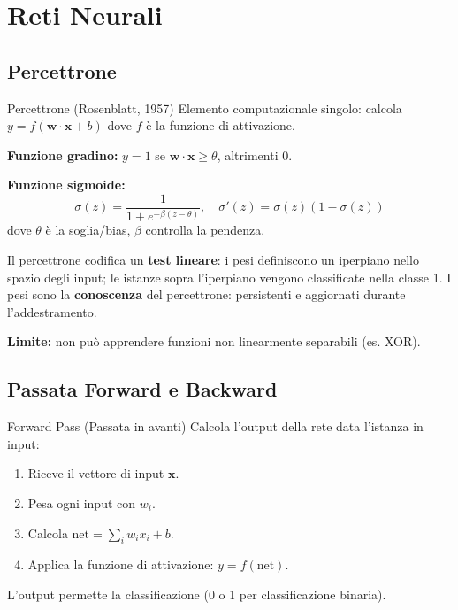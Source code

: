 \documentclass[12pt,a4paper]{article}
\begin{document}
\section{Reti Neurali}

\subsection{Percettrone}

\begin{defbox}{Percettrone (Rosenblatt{,} 1957)}
Elemento computazionale singolo: calcola $y = f(\mathbf{w} \cdot \mathbf{x} + b)$ dove $f$ è la funzione di attivazione.

\textbf{Funzione gradino:} $y = 1$ se $\mathbf{w}\cdot\mathbf{x} \geq \theta$, altrimenti $0$.

\textbf{Funzione sigmoide:}
\[
\sigma(z) = \frac{1}{1 + e^{-\beta(z - \theta)}}, \quad \sigma'(z) = \sigma(z)(1-\sigma(z))
\]
dove $\theta$ è la soglia/bias, $\beta$ controlla la pendenza.

Il percettrone codifica un \textbf{test lineare}: i pesi definiscono un iperpiano nello spazio degli input; le istanze sopra l'iperpiano vengono classificate nella classe 1. I pesi sono la \textbf{conoscenza} del percettrone: persistenti e aggiornati durante l'addestramento.

\textbf{Limite:} non può apprendere funzioni non linearmente separabili (es. XOR).
\end{defbox}

\subsection{Passata Forward e Backward}

\begin{defbox}{Forward Pass (Passata in avanti)}
Calcola l'output della rete data l'istanza in input:
\begin{enumerate}[noitemsep]
  \item Riceve il vettore di input $\mathbf{x}$.
  \item Pesa ogni input con $w_i$.
  \item Calcola $\text{net} = \sum_i w_i x_i + b$.
  \item Applica la funzione di attivazione: $y = f(\text{net})$.
\end{enumerate}
L'output permette la classificazione (0 o 1 per classificazione binaria).
\end{defbox}
\end{document}
